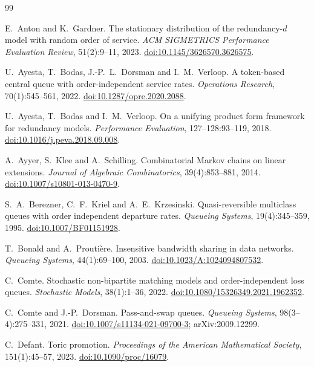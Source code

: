 \documentclass[11pt,a4paper]{article}
\theoremstyle{plain}
\theoremstyle{plain}
\begin{document}
\begin{thebibliography}{99}\small

E.~Anton and K.~Gardner.
The stationary distribution of the redundancy-$d$ model with random order of service.
\emph{ACM SIGMETRICS Performance Evaluation Review}, 51(2):9--11, 2023.
\href{https://doi.org/10.1145/3626570.3626575}{doi:10.1145/3626570.3626575}.

U.~Ayesta, T.~Bodas, J.-P.~L.~Dorsman and I.~M.~Verloop.
A token-based central queue with order-independent service rates.
\emph{Operations Research}, 70(1):545--561, 2022.
\href{https://doi.org/10.1287/opre.2020.2088}{doi:10.1287/opre.2020.2088}.

U.~Ayesta, T.~Bodas and I.~M.~Verloop.
On a unifying product form framework for redundancy models.
\emph{Performance Evaluation}, 127--128:93--119, 2018.
\href{https://doi.org/10.1016/j.peva.2018.09.008}{doi:10.1016/j.peva.2018.09.008}.

A.~Ayyer, S.~Klee and A.~Schilling.
Combinatorial Markov chains on linear extensions.
\emph{Journal of Algebraic Combinatorics}, 39(4):853--881, 2014.
\href{https://doi.org/10.1007/s10801-013-0470-9}{doi:10.1007/s10801-013-0470-9}.

S.~A.~Berezner, C.~F.~Kriel and A.~E.~Krzesinski.
Quasi-reversible multiclass queues with order independent departure rates.
\emph{Queueing Systems}, 19(4):345--359, 1995.
\href{https://doi.org/10.1007/BF01151928}{doi:10.1007/BF01151928}.

T.~Bonald and A.~Prouti\`ere.
Insensitive bandwidth sharing in data networks.
\emph{Queueing Systems}, 44(1):69--100, 2003.
\href{https://doi.org/10.1023/A:1024094807532}{doi:10.1023/A:1024094807532}.

C.~Comte.
Stochastic non-bipartite matching models and order-independent loss queues.
\emph{Stochastic Models}, 38(1):1--36, 2022.
\href{https://doi.org/10.1080/15326349.2021.1962352}{doi:10.1080/15326349.2021.1962352}.

C.~Comte and J.-P.~Dorsman.
Pass-and-swap queues.
\emph{Queueing Systems}, 98(3--4):275--331, 2021.
\href{https://doi.org/10.1007/s11134-021-09700-3}{doi:10.1007/s11134-021-09700-3}; arXiv:2009.12299.

C.~Defant.
Toric promotion.
\emph{Proceedings of the American Mathematical Society}, 151(1):45--57, 2023.
\href{https://doi.org/10.1090/proc/16079}{doi:10.1090/proc/16079}.


\end{thebibliography}
\end{document}
